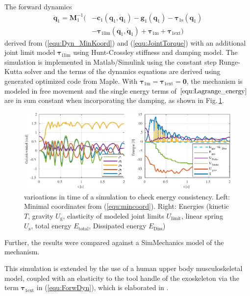 \documentclass[letterpaper, 10 pt, conference]{ieeeconf}  %
\begin{document}
The forward dynamics
\begin{align}
\ddot{\bm{q}}_1 = \bm{M}_1^{-1}( &-\bm{c}_1(\bm{q}_1,\dot{\bm{q}}_1)-\bm{g}_1(\bm{q}_1) -\bm{\tau}_{1\mathrm{s}}(\bm{q}_1) \nonumber \\
& - \bm{\tau}_{1\mathrm{lim}}(\bm{q}_1,\dot{\bm{q}}_1)  + \bm{\tau}_{1\mathrm{m}} + \bm{\tau}_{1\mathrm{ext}})
\label{equ:ForwDyn}
\end{align}
derived from (\ref{equ:Dyn_MinKoord}) and (\ref{equ:JointTorque}) with an additional joint limit model $\bm{\tau}_{1\mathrm{lim}}$ using Hunt-Crossley stiffness and damping model.
The simulation is implemented in Matlab/Simulink using the constant step Runge-Kutta solver and the terms of the dynamics equations are derived using generated optimized code from Maple.
With $\bm{\tau}_{1\mathrm{m}} = \bm{\tau}_{1\mathrm{ext}} = \bm{0}$, the mechanism is modeled in free movement and the single energy terms of $\ref{equ:Lagrange_energy}$ are in sum constant when incorporating the damping, as shown in Fig.\,\ref{fig:SimulationEnergiekonsistenz}.
%
\begin{figure}[htb!]
    \includegraphics{figures/KAS5m5_Gelenkgrenzmodell_q_E.pdf} 
    \caption{varioations in time of a simulation to check energy consistency. Left: Minimal coordinates from (\ref{equ:mincoord}). Right: Energies (kinetic $T$, gravity $U_\mathrm{g}$, elasticity of modeled joint limits $U_\mathrm{limit}$, linear spring $U_\mathrm{s}$, total energy $E_\mathrm{total}$, Dissipated energy $E_\mathrm{Diss}$)}
    \label{fig:SimulationEnergiekonsistenz}
\end{figure} 
%
Further, the results were compared against a SimMechanics model of the mechanism.

This simulation is extended by the use of a human upper body musculoskeletal model, coupled with an elasticity to the tool handle of the exoskeleton via the term $\bm{\tau}_{1\mathrm{ext}}$ in (\ref{equ:ForwDyn}), which is elaborated in \cite{KuehnHuSchHad2018}.
\end{document}
